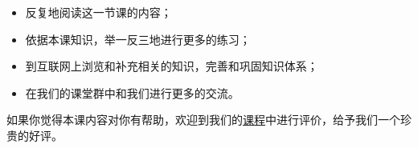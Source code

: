 \documentclass[11pt]{article}
\providecommand{\tightlist}{%
      \setlength{\itemsep}{0pt}\setlength{\parskip}{0pt}}
\begin{document}
\begin{itemize}
\tightlist
\item
  反复地阅读这一节课的内容；
\item
  依据本课知识，举一反三地进行更多的练习；
\item
  到互联网上浏览和补充相关的知识，完善和巩固知识体系；
\item
  在我们的课堂群中和我们进行更多的交流。
\end{itemize}

如果你觉得本课内容对你有帮助，欢迎到我们的\href{https://ke.qq.com/course/328764?tuin=2a5bd9a8}{课程}中进行评价，给予我们一个珍贵的好评。


    
    
    
    
\end{document}
